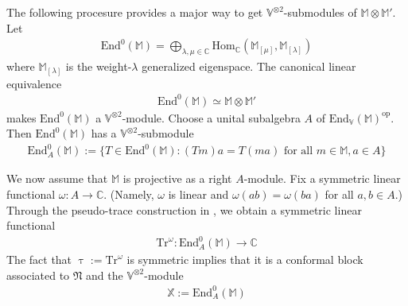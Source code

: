 \documentclass[11pt,b5paper,notitlepage]{article}
\theoremstyle{definition}
\theoremstyle{plain}
\newcommand{\Tr}{\mathrm{Tr}}
\newcommand{\End}{\mathrm{End}} %
\newcommand{\Hom}{\mathrm{Hom}}
\newcommand{\Vbb}{\mathbb V}
\newcommand{\Xbb}{\mathbb X}
\newcommand{\Mbb}{\mathbb M}
\newcommand{\Cbb}{\mathbb C}
\newcommand{\<}{\left\langle}
\renewcommand{\>}{\right\rangle}
\newcommand{\fn}{\mathfrak{N}}
\numberwithin{equation}{section}
\begin{document}
The following procesure provides a major way to get $\Vbb^{\otimes 2}$-submodules of $\Mbb\otimes\Mbb'$. Let
\begin{align*}
\End^0(\Mbb)=\bigoplus_{\lambda,\mu\in\Cbb}\Hom_\Cbb(\Mbb_{[\mu]},\Mbb_{[\lambda]})
\end{align*}
where $\Mbb_{[\lambda]}$ is the weight-$\lambda$ generalized eigenspace. The canonical linear equivalence
\begin{align*}
\End^0(\Mbb)\simeq\Mbb\otimes\Mbb'
\end{align*}
makes $\End^0(\Mbb)$ a $\Vbb^{\otimes 2}$-module. Choose a unital subalgebra $A$ of $\End_\Vbb(\Mbb)^{\mathrm{op}}$. Then $\End^0(\Mbb)$ has a $\Vbb^{\otimes 2}$-submodule
\begin{align*}
\End_A^0(\Mbb):=\{T\in\End^0(\Mbb):(Tm)a=T(m a)\text{ for all }m\in\Mbb,a\in A\}
\end{align*}

We now assume that $\Mbb$ is projective as a right $A$-module. Fix a symmetric linear functional $\omega:A\rightarrow\Cbb$. (Namely, $\omega$ is linear and $\omega(ab)=\omega(ba)$ for all $a,b\in A$.) Through the pseudo-trace construction in \cite{Ari10}, we obtain a symmetric linear functional
\begin{align*}
\Tr^\omega:\End^0_A(\Mbb)\rightarrow\Cbb
\end{align*}
The fact that $\uptau:=\Tr^\omega$ is symmetric implies that it is a conformal block associated to $\fn$ and the $\Vbb^{\otimes 2}$-module
\begin{align*}
\Xbb:=\End^0_A(\Mbb)
\end{align*}
\end{document}
